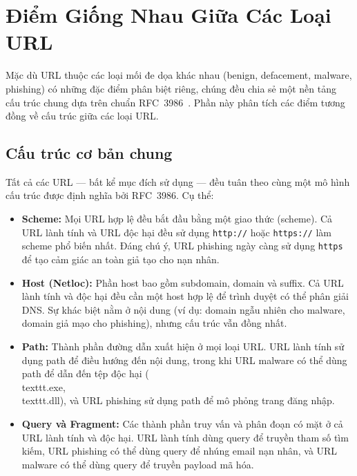 \documentclass[a4paper,12pt]{article}
\begin{document}
\section{Điểm Giống Nhau Giữa Các Loại URL}
\label{sec:similarities}

Mặc dù URL thuộc các loại mối đe dọa khác nhau (benign, defacement, malware, phishing) có những đặc điểm phân biệt riêng, chúng đều chia sẻ một nền tảng cấu trúc chung dựa trên chuẩn RFC~3986~\cite{rfc3986}. Phần này phân tích các điểm tương đồng về cấu trúc giữa các loại URL.

\subsection{Cấu trúc cơ bản chung}

Tất cả các URL --- bất kể mục đích sử dụng --- đều tuân theo cùng một mô hình cấu trúc được định nghĩa bởi RFC~3986. Cụ thể:

\begin{itemize}
    \item \textbf{Scheme:} Mọi URL hợp lệ đều bắt đầu bằng một giao thức (scheme). Cả URL lành tính và URL độc hại đều sử dụng \texttt{http://} hoặc \texttt{https://} làm scheme phổ biến nhất. Đáng chú ý, URL phishing ngày càng sử dụng \texttt{https} để tạo cảm giác an toàn giả tạo cho nạn nhân.

    \item \textbf{Host (Netloc):} Phần host bao gồm subdomain, domain và suffix. Cả URL lành tính và độc hại đều cần một host hợp lệ để trình duyệt có thể phân giải DNS. Sự khác biệt nằm ở nội dung (ví dụ: domain ngẫu nhiên cho malware, domain giả mạo cho phishing), nhưng cấu trúc vẫn đồng nhất.

    \item \textbf{Path:} Thành phần đường dẫn xuất hiện ở mọi loại URL. URL lành tính sử dụng path để điều hướng đến nội dung, trong khi URL malware có thể dùng path để dẫn đến tệp độc hại (\\texttt{.exe}, \\texttt{.dll}), và URL phishing sử dụng path để mô phỏng trang đăng nhập.

    \item \textbf{Query và Fragment:} Các thành phần truy vấn và phân đoạn có mặt ở cả URL lành tính và độc hại. URL lành tính dùng query để truyền tham số tìm kiếm, URL phishing có thể dùng query để nhúng email nạn nhân, và URL malware có thể dùng query để truyền payload mã hóa.
\end{itemize}
\end{document}
